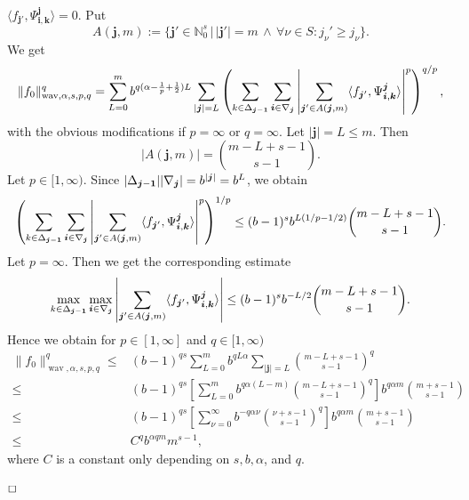 \documentclass[12pt]{article}
\DeclareMathOperator{\wav}{wav}
\newenvironment{proof}{\begin{trivlist}
    \item[\hskip\labelsep{\it Proof.}]}{$\hfill\Box$\end{trivlist}}
\newcommand{\bsk}{\boldsymbol{k}}
\newcommand{\bsi}{\boldsymbol{i}}
\newcommand{\bsj}{\boldsymbol{j}}
\newcommand{\NN}{\mathbb{N}}
\begin{document}
\begin{proof}[Proof of Theorem \ref{LowerBound}]
$\langle f_{\bsj'}, \Psi^{\bsj}_{\bsi, \bsk} \rangle = 0$.
Put 
\begin{equation*}
A(\bsj,m) := \{\bsj'\in \NN^s_0 \,|\, |\bsj'|=m \, \wedge \, \forall \nu\in S: 
j_\nu' \ge j_\nu \}.
\end{equation*}
We get
\begin{equation*}
\|f_0\|^q_{\wav,\alpha,s,p,q}
= \sum_{L=0}^m b^{q(\alpha - \frac{1}{p} + \frac{1}{2})L} 
\sum_{|\bsj| =L}
\left( \sum_{k\in\Delta_{\bsj-{\bf 1}}} \sum_{\bsi\in\nabla_{\bsj}}
\left| \sum_{\bsj'\in A(\bsj,m)} 
\langle f_{\bsj'}, \Psi^{\bsj}_{\bsi, \bsk} \rangle
\right|^p \right)^{q/p},
\end{equation*}
with the obvious modifications if $p=\infty$ or $q=\infty$.
Let $|\bsj| = L \le m$.
Then
\begin{equation*}
|A(\bsj,m)| = { m-L +s-1 \choose s-1}.
\end{equation*} 
Let $p\in [1,\infty)$. Since $|\Delta_{\bsj-{\bf 1}}| |\nabla_{\bsj}|= b^{|\bsj|} = b^L$, we obtain
\begin{equation*}
\left( \sum_{k\in\Delta_{\bsj-{\bf 1}}} \sum_{\bsi\in\nabla_{\bsj}}
\left| \sum_{\bsj'\in A(\bsj,m)} 
\langle f_{\bsj'}, \Psi^{\bsj}_{\bsi, \bsk} \rangle
\right|^p \right)^{1/p} \le (b-1)^s b^{L(1/p -1/2)} { m-L +s-1 \choose s-1}.
\end{equation*}
Let $p = \infty$. Then we get the corresponding estimate
\begin{equation*}
\max_{k\in\Delta_{\bsj-{\bf 1}}} \max_{\bsi\in\nabla_{\bsj}}
\left| \sum_{\bsj'\in A(\bsj,m)} 
\langle f_{\bsj'}, \Psi^{\bsj}_{\bsi, \bsk} \rangle
\right|  \le (b-1)^s b^{-L/2} { m-L +s-1 \choose s-1}.
\end{equation*}
Hence we obtain for $p\in [1,\infty]$ and $q\in [1,\infty)$
\begin{equation*}
\begin{split}
\|f_0\|^q_{\wav,\alpha,s,p,q} 
\le& (b-1)^{qs} \sum^m_{L=0} b^{qL\alpha} \sum_{|\bsj|=L} 
{m-L+s-1 \choose s-1}^q \\
\le& (b-1)^{qs} \left[\sum_{L=0}^m b^{q\alpha(L-m)} 
{m-L+s-1 \choose s-1}^q \right] b^{q\alpha m} 
{m+s-1 \choose s-1}\\
\le& (b-1)^{qs} \left[\sum_{\nu=0}^\infty b^{-q\alpha\nu} 
{\nu+s-1 \choose s-1}^q \right] b^{q\alpha m} 
{m+s-1 \choose s-1}\\
\le& C^q  b^{\alpha qm}m^{s-1},
\end{split}
\end{equation*}
where $C$
is a constant only depending on $s,b,\alpha$, and $q$.


\end{proof}
\end{document}
